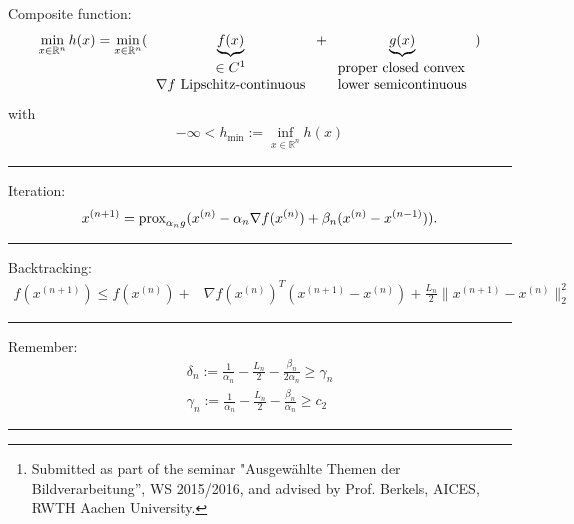 \documentclass[onecolumn,final,a4paper,13pt,reqno]{siamart}
\title{{\TheTitle}}
\author{
  David Stutz\thanks{Submitted as part of the seminar "Ausgew\"ahlte Themen der Bildverarbeitung'', WS 2015/2016, and advised by Prof. Berkels, AICES, RWTH Aachen University.}
}
\DeclareRobustCommand{\prox}[1]{%
    \ifmmode
        \text{prox}_{#1}
    \else
        $\text{prox}_{#1}$
    \fi
}
\begin{document}
	\maketitle
	
	Composite function:
	\begin{align}
		\min_{x \in \mathbb{R}^n} h(x) = \min_{x \in \mathbb{R}^n} (\underbrace{f(x)}_{\begin{tabular}{c}$\in C^1$\\$\nabla f$ Lipschitz-continuous\end{tabular}} + \underbrace{g(x)}_{\begin{tabular}{l}proper closed convex\\lower semicontinuous\end{tabular}})
	\end{align}
	with
	\begin{align}
		-\infty < h_{\min} := \inf _{x \in \mathbb{R}^n} h(x)
	\end{align}
	\noindent\rule{\textwidth}{0.1pt}
	
	Iteration:
	\begin{align}
		x^{(n + 1)} = \prox{\alpha_n g}(x^{(n)} - \alpha_n \nabla f(x^{(n)}) + \beta_n(x^{(n)} - x^{(n - 1)})).\label{eq:iteration}
	\end{align}
	\noindent\rule{\textwidth}{0.1pt}
	
	Backtracking:
	\begin{align}
		f(x^{(n + 1)}) \leq f(x^{(n)}) + &\nabla f(x^{(n)})^T (x^{(n + 1)} - x^{(n)}) + \frac{L_n}{2} \|x^{(n + 1)} - x^{(n)}\|_2^2
	\end{align}
	\noindent\rule{\textwidth}{0.1pt}
	
	Remember:
	\begin{align}
		\delta_n := \frac{1}{\alpha_n} - \frac{L_n}{2} - \frac{\beta_n}{2\alpha_n} \geq \gamma_n\label{eq:delta}\\
		\gamma_n := \frac{1}{\alpha_n} - \frac{L_n}{2} - \frac{\beta_n}{\alpha_n} \geq c_2\label{eq:gamma}
	\end{align}
	\noindent\rule{\textwidth}{0.1pt}
	
\end{document}
